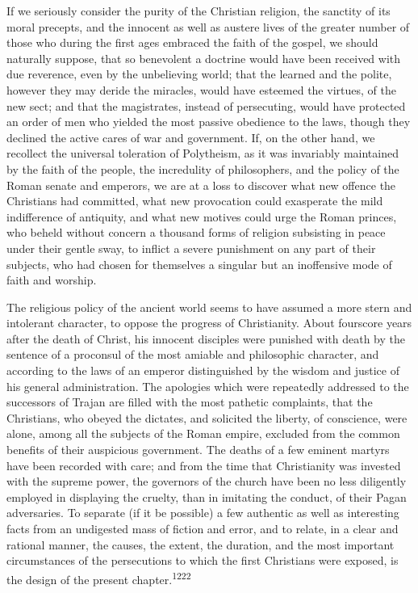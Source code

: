 If we seriously consider the purity of the Christian religion,
the sanctity of its moral precepts, and the innocent as well as
austere lives of the greater number of those who during the first
ages embraced the faith of the gospel, we should naturally
suppose, that so benevolent a doctrine would have been received
with due reverence, even by the unbelieving world; that the
learned and the polite, however they may deride the miracles,
would have esteemed the virtues, of the new sect; and that the
magistrates, instead of persecuting, would have protected an
order of men who yielded the most passive obedience to the laws,
though they declined the active cares of war and government. If,
on the other hand, we recollect the universal toleration of
Polytheism, as it was invariably maintained by the faith of the
people, the incredulity of philosophers, and the policy of the
Roman senate and emperors, we are at a loss to discover what new
offence the Christians had committed, what new provocation could
exasperate the mild indifference of antiquity, and what new
motives could urge the Roman princes, who beheld without concern
a thousand forms of religion subsisting in peace under their
gentle sway, to inflict a severe punishment on any part of their
subjects, who had chosen for themselves a singular but an
inoffensive mode of faith and worship.

The religious policy of the ancient world seems to have assumed a
more stern and intolerant character, to oppose the progress of
Christianity. About fourscore years after the death of Christ,
his innocent disciples were punished with death by the sentence
of a proconsul of the most amiable and philosophic character, and
according to the laws of an emperor distinguished by the wisdom
and justice of his general administration. The apologies which
were repeatedly addressed to the successors of Trajan are filled
with the most pathetic complaints, that the Christians, who
obeyed the dictates, and solicited the liberty, of conscience,
were alone, among all the subjects of the Roman empire, excluded
from the common benefits of their auspicious government. The
deaths of a few eminent martyrs have been recorded with care; and
from the time that Christianity was invested with the supreme
power, the governors of the church have been no less diligently
employed in displaying the cruelty, than in imitating the
conduct, of their Pagan adversaries. To separate (if it be
possible) a few authentic as well as interesting facts from an
undigested mass of fiction and error, and to relate, in a clear
and rational manner, the causes, the extent, the duration, and
the most important circumstances of the persecutions to which the
first Christians were exposed, is the design of the present
chapter.\textsuperscript{1222}


